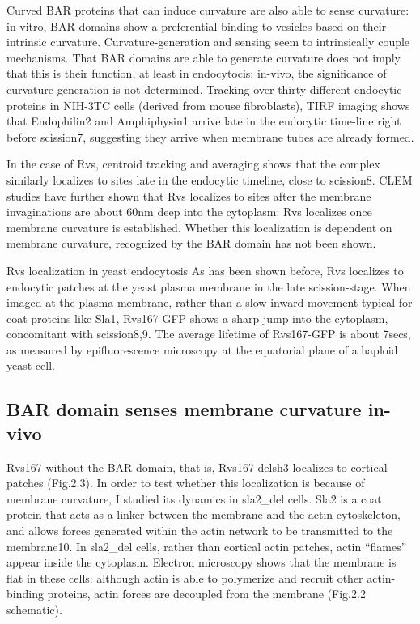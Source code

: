 \vspace{5mm}
Curved BAR proteins that can induce curvature are also able to sense curvature: in-vitro, BAR domains show a preferential-binding to vesicles based on their intrinsic curvature. Curvature-generation and sensing seem to intrinsically couple mechanisms. That BAR domains are able to generate curvature does not imply that this is their function, at least in endocytocis: in-vivo, the significance of curvature-generation is not determined. Tracking over thirty different endocytic proteins in NIH-3TC cells (derived from mouse fibroblasts), TIRF imaging shows that Endophilin2 and Amphiphysin1 arrive late in the endocytic time-line right before scission7, suggesting they arrive when membrane tubes are already formed. 

\vspace{5mm}
In the case of Rvs, centroid tracking and averaging shows that the complex similarly localizes to sites late in the endocytic timeline, close to scission8. CLEM studies have further shown that Rvs localizes to sites after the membrane invaginations are about 60nm deep into the cytoplasm: Rvs localizes once membrane curvature is established. Whether this localization is dependent on membrane curvature, recognized by the BAR domain has not been shown. 

\vspace{5mm}
Rvs localization in yeast endocytosis
As has been shown before, Rvs localizes to endocytic patches at the yeast plasma membrane in the late scission-stage. When imaged at the plasma membrane, rather than a slow inward movement typical for coat proteins like Sla1, Rvs167-GFP shows a sharp jump into the cytoplasm, concomitant with scission8,9. The average lifetime of Rvs167-GFP is about 7secs, as measured by epifluorescence microscopy at the equatorial plane of a haploid yeast cell. 


	\subsection{BAR domain senses membrane curvature in-vivo}
	Rvs167 without the BAR domain, that is, Rvs167-delsh3 localizes to cortical patches (Fig.2.3). In order to test whether this localization is because of membrane curvature, I studied its dynamics in sla2_del cells. Sla2 is a coat protein that acts as a linker between the membrane and the actin cytoskeleton, and allows forces generated within the actin network to be transmitted to the membrane10. In sla2_del cells, rather than cortical actin patches, actin “flames” appear inside the cytoplasm. Electron microscopy shows that the membrane is flat in these cells: although actin is able to polymerize and recruit other actin-binding proteins, actin forces are decoupled from the membrane (Fig.2.2 schematic). 
	
